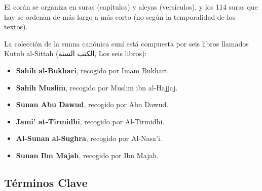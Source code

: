 \documentclass[12pt]{report}
\begin{document}
	El corán se organiza en suras (capítulos) y aleyas (versículos), y los 114 suras que hay se ordenan de más largo a más corto (no según la temporalidad de los textos).
	
	La colección de la sunna canónica suní está compuesta por seis libros llamados Kutub al-Sittah (\textarabic{الكتب الستة}, Los seis libros):
	\begin{itemize}
		\item \textbf{Sahih al-Bukhari}, recogido por Imam Bukhari.
		\item \textbf{Sahih Muslim}, recogido por Muslim ibn al-Hajjaj.
		\item \textbf{Sunan Abu Dawud}, recogido por Abu Dawud.
		\item \textbf{Jami' at-Tirmidhi}, recogido por Al-Tirmidhi.
		\item \textbf{Al-Sunan al-Sughra}, recogido por Al-Nasa'i.
		\item \textbf{Sunan Ibn Majah}, recogido por Ibn Majah.
	\end{itemize}
	

	\subsection{Términos Clave}
	
\end{document}
